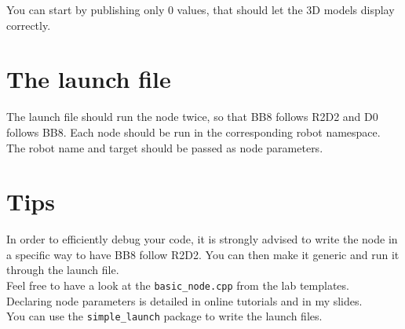 \documentclass{ecnreport}
\begin{document}
You can start by publishing only 0 values, that should let the 3D models display correctly.

\section{The launch file}

The launch file should run the node twice, so that BB8 follows R2D2 and D0 follows BB8. Each node should be run in the corresponding robot namespace. The robot name and target should be passed as node parameters.

\section{Tips}

In order to efficiently debug your code, it is strongly advised to write the node in a specific way to have BB8 follow R2D2. You can then make it generic and run it through the launch file.\\

Feel free to have a look at the \texttt{basic\_node.cpp} from the lab templates.\\

Declaring node parameters is detailed in online tutorials and in my slides.\\

You can use the \texttt{simple\_launch} package to write the launch files.\\
\end{document}
